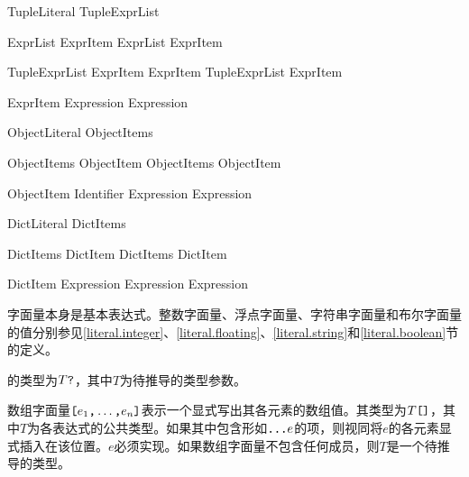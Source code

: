 \begin{bnf}{TupleLiteral}
    \terminal{(} TupleExprList\bnfq \terminal{)}
\end{bnf}

\begin{bnf}{ExprList}
    ExprItem \br
    ExprList \terminal{,} ExprItem
\end{bnf}

\begin{bnf}{TupleExprList}
    ExprItem \terminal{,} ExprItem \br
    TupleExprList \terminal{,} ExprItem
\end{bnf}

\begin{bnf}{ExprItem}
    Expression \br
     Expression
\end{bnf}

\begin{bnf}{ObjectLiteral}
    \terminal{\{} ObjectItems \terminal{\}}
\end{bnf}

\begin{bnf}{ObjectItems}
    ObjectItem \br
    ObjectItems \terminal{,} ObjectItem
\end{bnf}

\begin{bnf}{ObjectItem}
    Identifier \terminal{:} Expression \br
     Expression
\end{bnf}

\begin{bnf}{DictLiteral}
    \terminal{\{|} DictItems\bnfq \terminal{|\}}
\end{bnf}

\begin{bnf}{DictItems}
    DictItem \br
    DictItems \terminal{,} DictItem
\end{bnf}

\begin{bnf}{DictItem}
    Expression \terminal{:} Expression \br
     Expression
\end{bnf}

\pnum
字面量本身是基本表达式。整数字面量、浮点字面量、字符串字面量和布尔字面量的值分别参见\ref{literal.integer}、\ref{literal.floating}、\ref{literal.string}和\ref{literal.boolean}节的定义。

\pnum
{}的类型为$T\texttt{?}$，其中$T$为待推导的类型参数。

\pnum
数组字面量$\texttt{[}e_1\texttt{,}\ldots\texttt{,}e_n\texttt{]}$表示一个显式写出其各元素的数组值。其类型为$T\texttt{[]}$，其中$T$为各表达式的公共类型。如果其中包含形如$\texttt{...}e$的项，则视同将$e$的各元素显式插入在该位置。$e$必须实现。如果数组字面量不包含任何成员，则$T$是一个待推导的类型。

